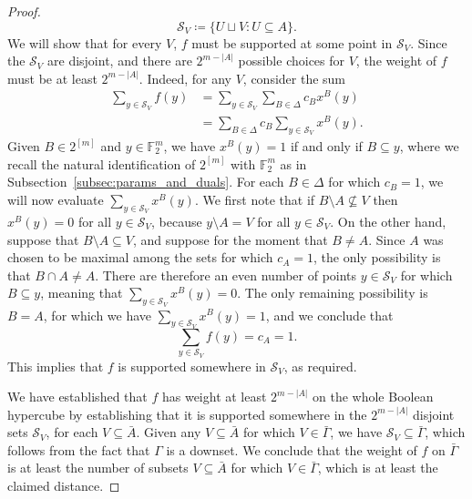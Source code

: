 \documentclass{article}
\newcounter{main}[section]
\begin{document}
\begin{proof}
    \begin{equation}
        \mathcal{S}_V \coloneq \{U \sqcup V: U \subseteq A\}.
    \end{equation}
    We will show that for every $V$, $f$ must be supported at some point in $\mathcal{S}_V$. Since the $\mathcal{S}_V$ are disjoint, and there are $2^{m-|A|}$ possible choices for $V$, the weight of $f$ must be at least $2^{m-|A|}$. Indeed, for any $V$, consider the sum 
    \begin{align}
        \sum_{y \in \mathcal{S}_V}f(y) &= \sum_{y \in \mathcal{S}_V}\sum_{B \in \Delta}c_Bx^B(y)\\
        &=\sum_{B \in \Delta}c_B\sum_{y \in \mathcal{S}_V}x^B(y).
    \end{align}
    Given $B \in 2^{[m]}$ and $y \in \mathbb{F}_2^m$, we have $x^B(y) = 1$ if and only if $B \subseteq y$, where we recall the natural identification of $2^{[m]}$ with $\mathbb{F}_2^m$ as in Subsection~\ref{subsec:params_and_duals}. For each $B\in \Delta$ for which $c_B = 1$, we will now evaluate $\sum_{y \in \mathcal{S}_V}x^B(y)$. We first note that if $B \setminus A \not\subseteq V$ then $x^B(y) = 0$ for all $y \in \mathcal{S}_V$, because $y \setminus A = V$ for all $y \in \mathcal{S}_V$. On the other hand, suppose that $B \setminus A \subseteq V$, and suppose for the moment that $B \neq A$. Since $A$ was chosen to be maximal among the sets for which $c_A = 1$, the only possibility is that $B \cap A \neq A$. There are therefore an even number of points $y \in \mathcal{S}_V$ for which $B \subseteq y$, meaning that $\sum_{y \in \mathcal{S}_V} x^B(y) = 0$. The only remaining possibility is $B = A$, for which we have $\sum_{y \in \mathcal{S}_V} x^B(y) = 1$, and we conclude that
    \begin{equation}
        \sum_{y \in \mathcal{S}_V}f(y) = c_A = 1.
    \end{equation}
    This implies that $f$ is supported somewhere in $\mathcal{S}_V$, as required.

    We have established that $f$ has weight at least $2^{m-|A|}$ on the whole Boolean hypercube by establishing that it is supported somewhere in the $2^{m-|A|}$ disjoint sets $\mathcal{S}_V$, for each $V \subseteq \bar{A}$. Given any $V \subseteq \bar{A}$ for which $V \in \bar{\Gamma}$, we have $\mathcal{S}_V \subseteq \bar{\Gamma}$, which follows from the fact that $\Gamma$ is a downset. We conclude that the weight of $f$ on $\bar{\Gamma}$ is at least the number of subsets $V \subseteq \bar{A}$ for which $V \in \bar{\Gamma}$, which is at least the claimed distance.
\end{proof}
\end{document}
